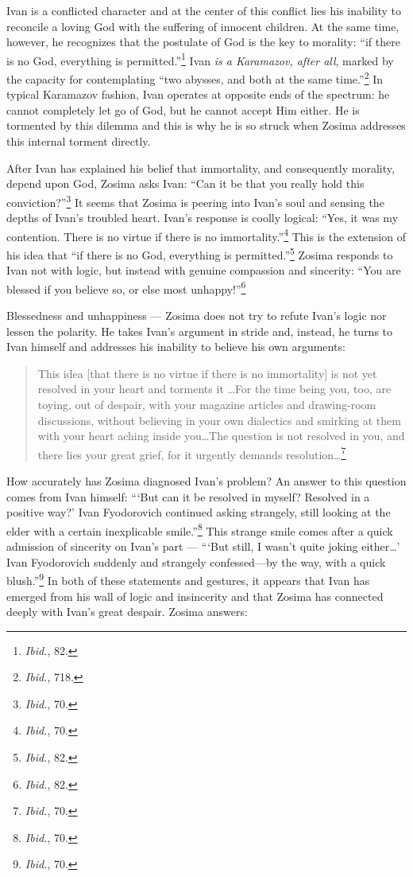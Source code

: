Ivan is a conflicted character and at the center of this conflict lies his inability to reconcile a loving God with the suffering of innocent children. At the same time, however, he recognizes that the postulate of God is the key to morality: ``if there is no God, everything is permitted.''\footnote{\emph{Ibid.}, 82.} Ivan \emph{is a Karamazov, after all}, marked by the capacity for contemplating ``two abysses, and both at the same time.''\footnote{\emph{Ibid.}, 718.} In typical Karamazov fashion, Ivan operates at opposite ends of the spectrum: he cannot completely let go of God, but he cannot accept Him either. He is tormented by this dilemma and this is why he is so struck when Zosima addresses this internal torment directly.

After Ivan has explained his belief that immortality, and consequently morality, depend upon God, Zosima asks Ivan: ``Can it be that you really hold this conviction?''\footnote{\emph{Ibid.}, 70.} It seems that Zosima is peering into Ivan's soul and sensing the depths of Ivan's troubled heart. Ivan's response is coolly logical: ``Yes, it was my contention. There is no virtue if there is no immortality.''\footnote{\emph{Ibid.}, 70.} This is the extension of his idea that ``if there is no God, everything is permitted.''\footnote{\emph{Ibid.}, 82.} Zosima responds to Ivan not with logic, but instead with genuine compassion and sincerity: ``You are blessed if you believe so, or else most unhappy!\thinspace''\footnote{\emph{Ibid.}, 82.}

Blessedness and unhappiness --- Zosima does not try to refute Ivan's logic nor lessen the polarity. He takes Ivan's argument in stride and, instead, he turns to Ivan himself and addresses his inability to believe his own arguments: 

\begin{quote}
\singlespacing
This idea [that there is no virtue if there is no immortality] is not yet resolved in your heart and torments it \ldots For the time being you, too, are toying, out of despair, with your magazine articles and drawing-room discussions, without believing in your own dialectics and smirking at them with your heart aching inside you\ldots The question is not resolved in you, and there lies your great grief, for it urgently demands resolution\ldots \footnote{\emph{Ibid.}, 70.}
\end{quote}

How accurately has Zosima diagnosed Ivan's problem? An answer to this question comes from Ivan himself: ``\thinspace`But can it be resolved in myself? Resolved in a positive way?' Ivan Fyodorovich continued asking strangely, still looking at the elder with a certain inexplicable smile.''\footnote{\emph{Ibid.}, 70.} This strange smile comes after a quick admission of sincerity on Ivan's part --- ``\thinspace`But still, I wasn't quite joking either\ldots' Ivan Fyodorovich suddenly and strangely confessed---by the way, with a quick blush.''\footnote{\emph{Ibid.}, 70.} In both of these statements and gestures, it appears that Ivan has emerged from his wall of logic and insincerity and that Zosima has connected deeply with Ivan's great despair. Zosima answers: 

